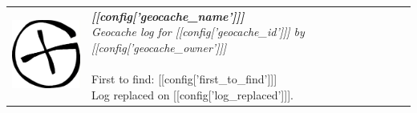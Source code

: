 \documentclass[a4paper]{report}
\begin{document}
\thispagestyle{empty}
\sffamily %
\setlength{\tabcolsep}{0.25cm} %
\setlength{\parindent}{0cm} %

\begin{tabular}{p{3cm} p{15cm}}
\vspace{0pt} %
\includegraphics[height=2.8cm,keepaspectratio]{logo}
& 
\vspace{0pt}
\parbox[t]{15cm}{ %
    \huge\emph{\textbf{[[config['geocache_name']]] }}
    \\
    \large\emph{ Geocache log for [[config['geocache_id']]] by [[config['geocache_owner']]]}
    \\
    \\
    \large First to find: [[config['first_to_find']]] 
    \\
    Log replaced on [[config['log_replaced']]].
}
\end{tabular}
\\
\\
\end{document}
